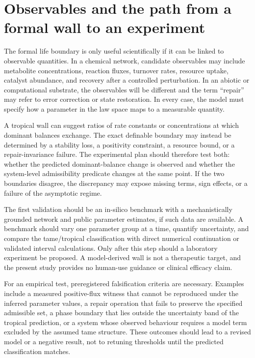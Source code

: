 \documentclass[11pt,a4paper]{article}
\theoremstyle{definition}
\theoremstyle{remark}
\begin{document}
\section{Observables and the path from a formal wall to an experiment}
The formal life boundary is only useful scientifically if it can be linked to observable quantities. In a chemical network, candidate observables may include metabolite concentrations, reaction fluxes, turnover rates, resource uptake, catalyst abundance, and recovery after a controlled perturbation. In an abiotic or computational substrate, the observables will be different and the term ``repair'' may refer to error correction or state restoration. In every case, the model must specify how a parameter in the law space maps to a measurable quantity.

A tropical wall can suggest ratios of rate constants or concentrations at which dominant balances exchange. The exact definable boundary may instead be determined by a stability loss, a positivity constraint, a resource bound, or a repair-invariance failure. The experimental plan should therefore test both: whether the predicted dominant-balance change is observed and whether the system-level admissibility predicate changes at the same point. If the two boundaries disagree, the discrepancy may expose missing terms, sign effects, or a failure of the asymptotic regime.

The first validation should be an in-silico benchmark with a mechanistically grounded network and public parameter estimates, if such data are available. A benchmark should vary one parameter group at a time, quantify uncertainty, and compare the tame/tropical classification with direct numerical continuation or validated interval calculations. Only after this step should a laboratory experiment be proposed. A model-derived wall is not a therapeutic target, and the present study provides no human-use guidance or clinical efficacy claim.

For an empirical test, preregistered falsification criteria are necessary. Examples include a measured positive-flux witness that cannot be reproduced under the inferred parameter values, a repair operation that fails to preserve the specified admissible set, a phase boundary that lies outside the uncertainty band of the tropical prediction, or a system whose observed behaviour requires a model term excluded by the assumed tame structure. These outcomes should lead to a revised model or a negative result, not to retuning thresholds until the predicted classification matches.
\end{document}
